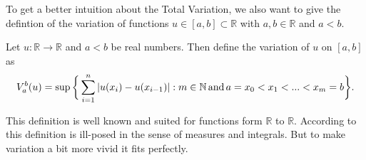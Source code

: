     To get a better intuition about the Total Variation, we also want to give the defintion of the variation of functions $u \in [a, b] \subset \mathbb{R}$ with $a, b \in \mathbb{R}$ and $a < b$.

    \begin{definition} %
    \label{def:variation_of_a_function}

        Let $u: \mathbb{R} \longrightarrow \mathbb{R}$ and $a < b$ be real numbers. Then define the variation of $u$ on $[a, b]$ as
            $$
                V^{b}_{a}(u) = \sup \bigg\{ \sum_{i = 1}^{n} |u(x_{i}) - u(x_{i - 1})| : m \in \mathbb{N} \,\textnormal{and}\, a = x_{0} < x_{1} < ... < x_{m} = b \bigg\}.
            $$

    \end{definition}

    This definition is well known and suited for functions form $\mathbb{R}$ to $\mathbb{R}$. According to \cite{Giusti} this definition is ill-posed in the sense of measures and integrals. But to make variation a bit more vivid it fits perfectly.

